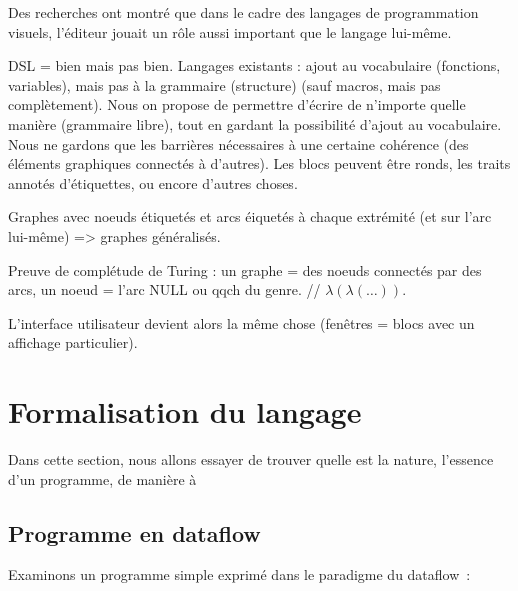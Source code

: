 \documentclass{article}
\begin{document}
Des recherches ont montré que dans le cadre des langages de programmation visuels, l'éditeur jouait un rôle aussi important que le langage
lui-même.

DSL = bien mais pas bien. Langages existants : ajout au vocabulaire (fonctions, variables), mais pas à la grammaire (structure) (sauf
macros, mais pas complètement). Nous on propose de permettre d'écrire de n'importe quelle manière (grammaire libre), tout en gardant la
possibilité d'ajout au vocabulaire. Nous ne gardons que les barrières nécessaires à une certaine cohérence (des éléments graphiques
connectés à d'autres). Les blocs peuvent être ronds, les traits annotés d'étiquettes, ou encore d'autres choses.

Graphes avec noeuds étiquetés et arcs éiquetés à chaque extrémité (et sur l'arc lui-même) => graphes généralisés.

Preuve de complétude de Turing : un graphe = des noeuds connectés par des arcs, un noeud = l'arc NULL ou qqch du genre. // $\lambda(\lambda(\dots))$.

L'interface utilisateur devient alors la même chose (fenêtres = blocs avec un affichage particulier).

\section{Formalisation du langage}

Dans cette section, nous allons essayer de trouver quelle est la nature, l'essence d'un programme, de manière à 

\subsection{Programme en dataflow}

Examinons un programme simple exprimé dans le paradigme du dataflow~:
\end{document}
